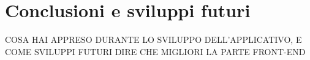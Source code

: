 \chapter{Conclusioni e sviluppi futuri}
\label{chap:conclusioni e sviluppi futuri}
COSA HAI APPRESO DURANTE LO SVILUPPO DELL'APPLICATIVO, E COME SVILUPPI FUTURI DIRE CHE MIGLIORI LA PARTE FRONT-END
